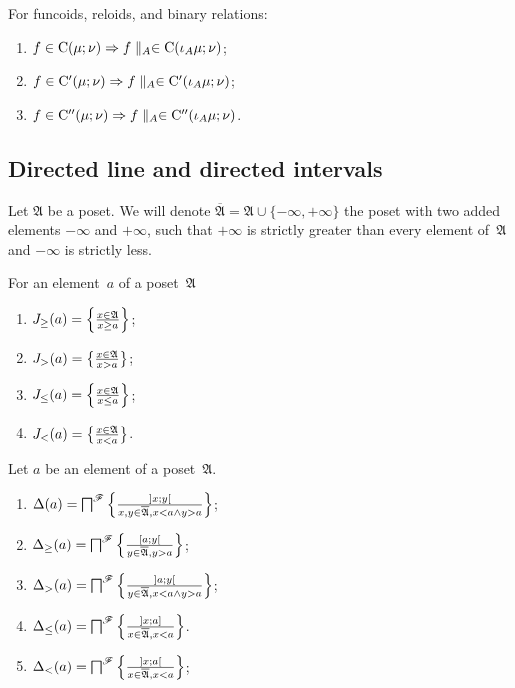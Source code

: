 \begin{prop}
For funcoids, reloids, and binary relations:
\begin{enumerate}
\item $f\in\mathrm{C}(\mu;\nu)\Rightarrow f\parallel_{A}\in\mathrm{C}(\iota_A\mu;\nu)$;
\item $f\in\mathrm{C}'(\mu;\nu)\Rightarrow f\parallel_{A}\in\mathrm{C}'(\iota_A\mu;\nu)$;
\item $f\in\mathrm{C}''(\mu;\nu)\Rightarrow f\parallel_{A}\in\mathrm{C}''(\iota_A\mu;\nu)$. 
\end{enumerate}
\end{prop}

\subsection{Directed line and directed intervals}

Let $\mathfrak{A}$ be a poset. We will denote $\overline{\mathfrak{A}}=\mathfrak{A}\cup\{-\infty,+\infty\}$ the poset
with two added elements $-\infty$ and $+\infty$, such that $+\infty$ is strictly greater than every element of~$\mathfrak{A}$
and $-\infty$ is strictly less.

\begin{defn}
For an element~$a$ of a poset~$\mathfrak{A}$
\begin{enumerate}
\item $J_{\geq}(a) = \left\{ \frac{x\in\mathfrak{A}}{x\geq a}\right\}$;
\item $J_{>}(a) = \left\{ \frac{x\in\mathfrak{A}}{x>a}\right\}$;
\item $J_{\leq}(a) = \left\{ \frac{x\in\mathfrak{A}}{x\leq a}\right\}$;
\item $J_{<}(a) = \left\{ \frac{x\in\mathfrak{A}}{x<a}\right\}$.
\end{enumerate}
\end{defn}

\begin{defn}
Let $a$ be an element of a poset~$\mathfrak{A}$.
\begin{enumerate}
\item $\Delta(a) = \bigsqcap^{\mathscr{F}} \left\{ \frac{]x;y[}{x,y\in\overline{\mathfrak{A}}, x<a\land y>a}\right\}$;
\item $\Delta_{\geq}(a) = \bigsqcap^{\mathscr{F}} \left\{ \frac{[a;y[}{y\in\overline{\mathfrak{A}}, y>a}\right\}$;
\item $\Delta_{>}(a) = \bigsqcap^{\mathscr{F}} \left\{ \frac{]a;y[}{y\in\overline{\mathfrak{A}}, x<a\land y>a}\right\}$;
\item $\Delta_{\leq}(a) = \bigsqcap^{\mathscr{F}} \left\{ \frac{]x;a]}{x\in\overline{\mathfrak{A}}, x<a}\right\}$.
\item $\Delta_{<}(a) = \bigsqcap^{\mathscr{F}} \left\{ \frac{]x;a[}{x\in\overline{\mathfrak{A}}, x<a}\right\}$;
\end{enumerate}
\end{defn}

